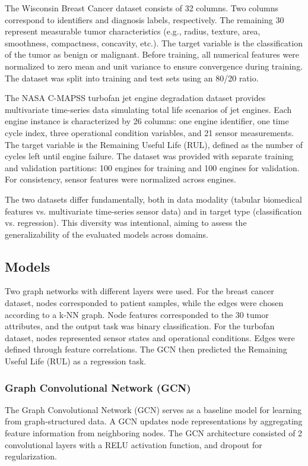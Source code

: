 \documentclass[12pt]{article}
\begin{document}
The Wisconsin Breast Cancer dataset consists of 32 columns. Two columns correspond to identifiers and diagnosis labels, respectively.
The remaining 30 represent measurable tumor characteristics (e.g., radius, texture, area, smoothness, compactness, concavity, etc.). The target variable is the classification of the tumor as benign or malignant. Before training, all numerical features were normalized to zero mean and unit variance to ensure convergence during training. The dataset was split into training and test sets using an 80/20 ratio.


The NASA C-MAPSS turbofan jet engine degradation dataset provides multivariate time-series data simulating total life scenarios of jet engines. Each engine instance is characterized by 26 columns: one engine identifier, one time cycle index, three operational condition variables, and 21 sensor measurements. The target variable is the Remaining Useful Life (RUL), defined as the number of cycles left until engine failure.
The dataset was provided with separate training and validation partitions: 100 engines for training and 100 engines for validation. For consistency, sensor features were normalized across engines.


The two datasets differ fundamentally, both in data modality (tabular biomedical features vs. multivariate time-series sensor data) and in target type (classification vs. regression). This diversity was intentional, aiming to assess the generalizability of the evaluated models across domains.


\subsection{Models}
Two graph networks with different layers were used.
For the breast cancer dataset, nodes corresponded to patient samples, while the edges were chosen according to a k-NN graph. Node features corresponded to the 30 tumor attributes, and the output task was binary classification.
For the turbofan dataset, nodes represented sensor states and operational conditions. Edges were defined through feature correlations. The GCN then predicted the Remaining Useful Life (RUL)
as a regression task.


\subsubsection{Graph Convolutional Network (GCN)}
The Graph Convolutional Network (GCN) serves as a baseline model for learning from graph-structured data. A GCN updates node representations by aggregating feature information from neighboring nodes.
The GCN architecture consisted of 2 convolutional layers with a  RELU activation function, and dropout for regularization.
\end{document}
